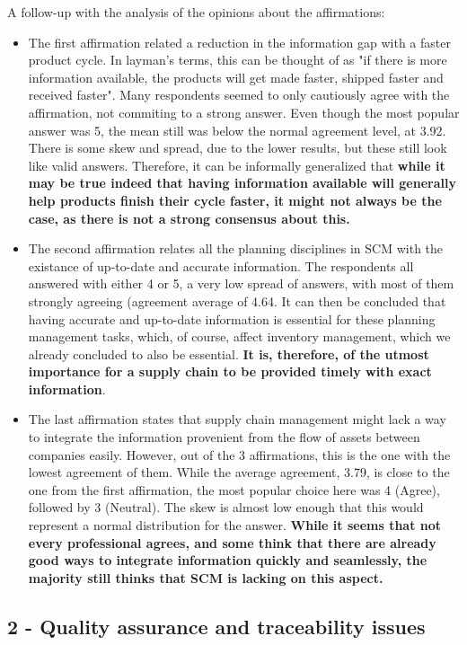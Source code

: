 A follow-up with the analysis of the opinions about the affirmations:
\begin{itemize}
  \item The first affirmation related a reduction in the information gap with a faster product cycle. In layman's terms, this can be thought of as "if there is more information available, the products will get made faster, shipped faster and received faster". Many respondents seemed to only cautiously agree with the affirmation, not commiting to a strong answer. Even though the most popular answer was 5, the mean still was below the normal agreement level, at 3.92. There is some skew and spread, due to the lower results, but these still look like valid answers. Therefore, it can be informally generalized that \textbf{while it may be true indeed that having information available will generally help products finish their cycle faster, it might not always be the case, as there is not a strong consensus about this.}
  \item The second affirmation relates all the planning disciplines in SCM with the existance of up-to-date and accurate information. The respondents all answered with either 4 or 5, a very low spread of answers, with most of them strongly agreeing (agreement average of 4.64. It can then be concluded that having accurate and up-to-date information is essential for these planning management tasks, which, of course, affect inventory management, which we already concluded to also be essential. \textbf{It is, therefore, of the utmost importance for a supply chain to be provided timely with exact information}.
  \item The last affirmation states that supply chain management might lack a way to integrate the information provenient from the flow of assets between companies easily. However, out of the 3 affirmations, this is the one with the lowest agreement of them. While the average agreement, 3.79, is close to the one from the first affirmation, the most popular choice here was 4 (Agree), followed by 3 (Neutral). The skew is almost low enough that this would represent a normal distribution for the answer. \textbf{While it seems that not every professional agrees, and some think that there are already good ways to integrate information quickly and seamlessly, the majority still thinks that SCM is lacking on this aspect.}
\end{itemize}

\subsection*{2 - Quality assurance and traceability issues}

